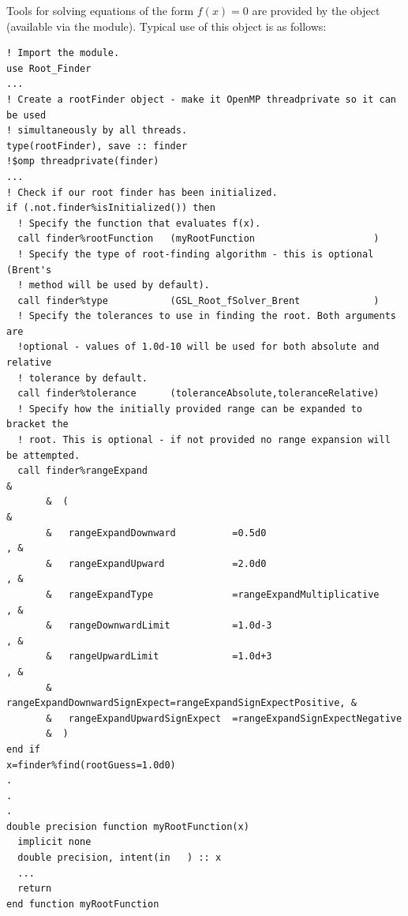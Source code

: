 Tools for solving equations of the form $f(x)=0$ are provided by the  object (available via the  module). Typical use of this object is as follows:
\begin{lstlisting}
! Import the module.
use Root_Finder
...
! Create a rootFinder object - make it OpenMP threadprivate so it can be used
! simultaneously by all threads.
type(rootFinder), save :: finder
!$omp threadprivate(finder)                                                                                                      
...
! Check if our root finder has been initialized.
if (.not.finder%isInitialized()) then
  ! Specify the function that evaluates f(x).
  call finder%rootFunction   (myRootFunction                     )
  ! Specify the type of root-finding algorithm - this is optional (Brent's
  ! method will be used by default).
  call finder%type           (GSL_Root_fSolver_Brent             )
  ! Specify the tolerances to use in finding the root. Both arguments are
  !optional - values of 1.0d-10 will be used for both absolute and relative
  ! tolerance by default.
  call finder%tolerance      (toleranceAbsolute,toleranceRelative)
  ! Specify how the initially provided range can be expanded to bracket the
  ! root. This is optional - if not provided no range expansion will be attempted.
  call finder%rangeExpand                                               & 
       &  (                                                             &
       &   rangeExpandDownward          =0.5d0                        , &
       &   rangeExpandUpward            =2.0d0                        , &
       &   rangeExpandType              =rangeExpandMultiplicative    , &
       &   rangeDownwardLimit           =1.0d-3                       , &
       &   rangeUpwardLimit             =1.0d+3                       , &
       &   rangeExpandDownwardSignExpect=rangeExpandSignExpectPositive, &
       &   rangeExpandUpwardSignExpect  =rangeExpandSignExpectNegative
       &  )
end if
x=finder%find(rootGuess=1.0d0)
.
.
.
double precision function myRootFunction(x)
  implicit none
  double precision, intent(in   ) :: x
  ...
  return
end function myRootFunction
\end{lstlisting}
